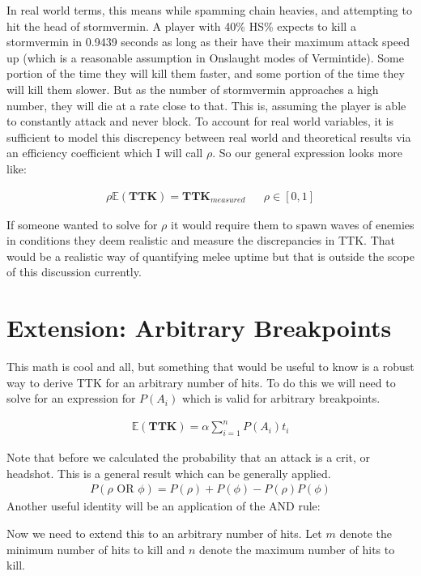 \documentclass{article}
\begin{document}
In real world terms, this means while spamming chain heavies, and attempting to hit the head of stormvermin. A player with 40\% HS\% expects to kill a stormvermin in 0.9439 seconds as long as their have their maximum attack speed up (which is a reasonable assumption in Onslaught modes of Vermintide). Some portion of the time they will kill them faster, and some portion of the time they will kill them slower. But as the number of stormvermin approaches a high number, they will die at a rate close to that. This is, assuming the player is able to constantly attack and never block. To account for real world variables, it is sufficient to model this discrepency between real world and theoretical results via an efficiency coefficient which I will call $\rho$. So our general expression looks more like:

\begin{align*}
\rho \mathbb{E}(\mathbf{TTK}) = \mathbf{TTK}_{measured} && \rho \in [0,1]
\end{align*}

If someone wanted to solve for $\rho$ it would require them to spawn waves of enemies in conditions they deem realistic and measure the discrepancies in TTK. That would be a realistic way of quantifying melee uptime but that is outside the scope of this discussion currently.

\section*{Extension: Arbitrary Breakpoints}

This math is cool and all, but something that would be useful to know is a robust way to derive TTK for an arbitrary number of hits. To do this we will need to solve for an expression for $P(A_i)$ which is valid for arbitrary breakpoints.

\begin{align*}
\mathbb{E}(\mathbf{TTK}) = \alpha \sum_{i=1}^{n} P(A_i) t_i
\end{align*}

Note that before we calculated the probability that an attack is a crit, or headshot. This is a general result which can be generally applied.
\begin{align*}
P(\rho \text{ OR } \phi) = P(\rho) + P(\phi) - P(\rho)P(\phi)
\end{align*}
Another useful identity will be an application of the AND rule:

Now we need to extend this to an arbitrary number of hits. Let $m$ denote the minimum number of hits to kill and $n$ denote the maximum number of hits to kill.

\section*{}
\end{document}
